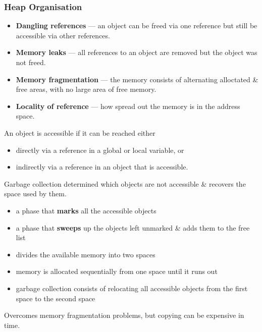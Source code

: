 \subsubsection{Heap Organisation}
\begin{itemize}
    \item \textbf{Dangling references} --- an object can be freed via one reference but 
    still be accessible via other references.
    \item \textbf{Memory leaks} --- all references to an object are removed but the object 
    was not freed.
    \item \textbf{Memory fragmentation} --- the memory consists of alternating alloctated 
    \& free areas, with no large area of free memory.
    \item \textbf{Locality of reference} --- how spread out the memory is in the address space.
\end{itemize}

An object is accessible if it can be reached either
\begin{itemize}
    \item directly via a reference in a global or local variable, or
    \item indirectly via a reference in an object that is accessible.
\end{itemize}
Garbage collection determined which objects are not accessible \& recovers the space used 
by them.

\begin{itemize}
    \item a phase that \textbf{marks} all the accessible objects
    \item a phase that \textbf{sweeps} up the objects left unmarked \& adds them to the 
    free list
\end{itemize}

\begin{itemize}
    \item divides the available memory into two spaces
    \item memory is allocated sequentially from one space until it runs out
    \item garbage collection consists of relocating all accessible objects from the first 
    space to the second space
\end{itemize}
Overcomes memory fragmentation problems, but copying can be expensive in time.

